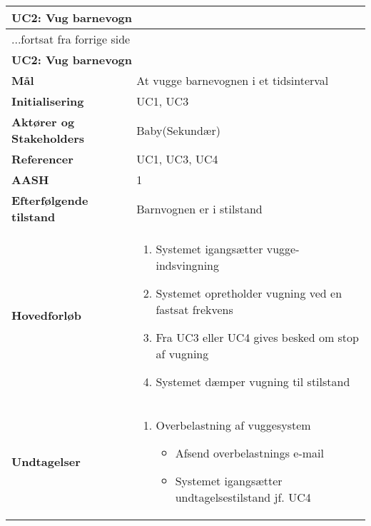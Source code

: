 \begin{center} \centering \label{kravspec:uc2}
	\begin{longtable}{|p{5cm}|p{9cm}|}  %
	\hline
		\multicolumn{2}{|l|}{\textbf{UC2: Vug barnevogn}} \\\hline %
		\endfirsthead
		
		\multicolumn{2}{l}{...fortsat fra forrige side} \\ \hline %
		\multicolumn{2}{|l|}{\textbf{UC2: Vug barnevogn}} \\\hline %
		\endhead	
		
		\textbf{Mål}							&At vugge barnevognen i et tidsinterval		\\\hline
		\textbf{Initialisering}				&UC1, UC3 \\\hline
		\textbf{Aktører og Stakeholders}		&Baby(Sekundær)		\\\hline 
		\textbf{Referencer}					&UC1, UC3, UC4		\\\hline
		\textbf{AASH}						&1		\\\hline
		\textbf{Efterfølgende tilstand}		&Barnvognen er i stilstand	\\\hline
		\textbf{Hovedforløb}					
			&\begin{enumerate}
	
				\item Systemet igangsætter vugge-indsvingning
				
				\item \label{kravspec:uc2_vugning}Systemet opretholder vugning ved en fastsat frekvens
				\newline [Und: \ref{kravspec:uc2_vugning}.a Overbelastning af vuggesystem]	
				
				\item \label{kravspec:uc2_stopvugning}Fra UC3 eller UC4 	gives besked om stop af vugning	
				
				\item Systemet dæmper vugning til stilstand
				
			\end{enumerate}
		\\\hline
		\textbf{Undtagelser}
			&\begin{enumerate}[label=\ref{kravspec:uc2_vugning}.a]
			\item Overbelastning af vuggesystem
					\begin{itemize}
					
					\item Afsend overbelastnings e-mail
					\item Systemet igangsætter undtagelsestilstand jf. UC4
					
					\end{itemize}
			\end{enumerate}
		\\\hline
	\end{longtable} 
\end{center}

